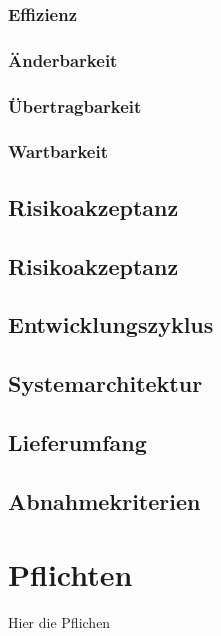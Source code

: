 \documentclass[a4paper,12pt]{article}
\begin{document}
            \subsubsection{Effizienz}
            
            
            \subsubsection{Änderbarkeit}
            
            
            \subsubsection{Übertragbarkeit}
            
            
            \subsubsection{Wartbarkeit}
            
        
        \subsection{Risikoakzeptanz}
 		
        
        \subsection{Risikoakzeptanz}
 		
        
        \subsection{Entwicklungszyklus}
 		
        
        \subsection{Systemarchitektur}
 		
        
        \subsection{Lieferumfang}
 		
        
        \subsection{Abnahmekriterien}
 		
 	\clearpage

	\section{Pflichten}
 	Hier die Pflichen
\end{document}
